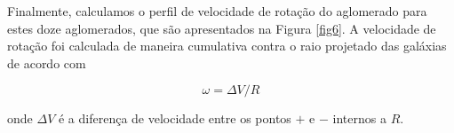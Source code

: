 \documentclass[12pt,fleqn]{article}
\begin{document}
{Finalmente, calculamos o perfil de velocidade de rotação do aglomerado para estes doze aglomerados, que são apresentados
na Figura \ref{fig6}. A velocidade de rotação foi calculada de maneira cumulativa contra o raio projetado das galáxias de acordo
com

\begin{equation}
\omega= \Delta V/R
\label{eq:eq10}
\end{equation}

\noindent onde $\Delta V$ é a diferença de velocidade entre os pontos $+$ e $-$ internos a $R$.




}
\end{document}
